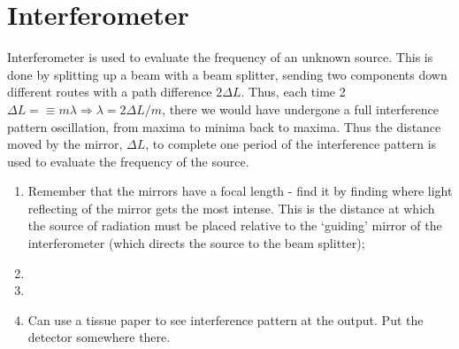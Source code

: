 \section{Interferometer}
  Interferometer is used to evaluate the frequency of an unknown source. This is done by splitting up a beam with a beam splitter, sending two components down different routes with a path difference $ 2\Delta L $. Thus, each time 2$ \Delta L =\equiv m\lambda\Rightarrow \lambda = 2\Delta L/m$, there we would have undergone a full interference pattern oscillation, from maxima to minima back to maxima. Thus the distance moved by the mirror, $ \Delta L $, to complete one period of the interference pattern is used to evaluate the frequency of the source.
  
  \begin{enumerate}
  	\item {} Remember that the mirrors have a focal length - find it by finding where light reflecting of the mirror gets the most intense. This is the distance at which the source of radiation must be placed relative to the `guiding' mirror of the interferometer (which directs the source to the beam splitter);
  	\item {}
  	\item {}
  	\item Can use a tissue paper to see interference pattern at the output. Put the detector somewhere there.
  \end{enumerate}  
 \newpage
 
 